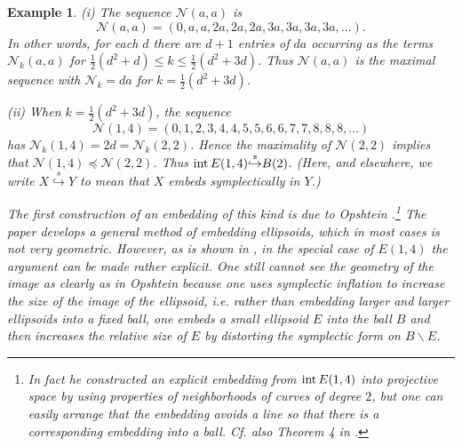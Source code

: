 \documentclass[11pt]{amsart}
\newcommand{\labell}[1] {\label{#1}}
\newcommand{\1}{{{\mathchoice {\rm 1\mskip-4mu l} {\rm 1\mskip-4mu l}
{\rm 1\mskip-4.5mu l} {\rm 1\mskip-5mu l}}}}
\newcommand{\intt}{{\rm int\,}}
\newcommand{\less}{{\smallsetminus}}
\newcommand{\Nn}{{\mathcal N}}
\newcommand{\se} {{\stackrel{s}\hookrightarrow}}
\newtheorem{example}[theorem]{Example}
\numberwithin{figure}{section}
\numberwithin{equation}{section}
\newcommand{\MS}{{\medskip}}
\newcommand{\NI}{{\noindent}}
\begin{document}
\begin{example}\labell{ex:1}\rm (i)
The sequence $\Nn(a,a)$ is
$$
\Nn(a,a) = (0,a,a,2a,2a,2a,3a,3a,3a,3a,\dots).
$$
In other words, for each $d$ there are $d+1$ entries of $da$ 
occurring as the terms $\Nn_k(a,a)$ for $\frac 12(d^2 + d) \le k \le \frac 12(d^2 + 3d)$.  Thus $\Nn(a,a)$ is the maximal sequence with $\Nn_k = da$ for $k = \frac 12(d^2 + 3d)$.
\MS

\NI (ii) When $k = \frac 12(d^2+3d)$, the sequence
$$
 \Nn(1,4) = (0,1,2,3,4,4,5,5,6,6,7,7,8,8,8,\dots)
$$
has $\Nn_k(1,4) = 2d = \Nn_k(2,2)$. Hence the maximality of
$\Nn(2,2)$ implies that
 $\Nn(1,4)\preccurlyeq \Nn(2,2)$.  Thus $\intt E(1,4)\se B(2)$. (Here, and elsewhere, we write $X\se Y$ to mean that $X$ embeds symplectically in $Y$.)  
 
 The first construction of  an embedding of this kind is due to Opshtein \cite{Op}.\footnote{
 In fact he constructed an explicit  embedding from $\intt E(1,4)$ into projective space by using properties of neighborhoods of curves of degree $2$, but one can easily arrange that the embedding  avoids a line so that  there is a corresponding embedding into a ball. Cf. also Theorem 4 in \cite{Op2}.}  
 The paper \cite{M} develops a general  method of embedding ellipsoids, which in most cases is not very geometric.  However, 
 as is shown in \cite[\S1]{M}, in the special case of $E(1,4)$ the argument can be made  rather explicit.  One still cannot see the geometry of the  image as clearly as in Opshtein because one uses symplectic inflation to increase the size of the image of the ellipsoid, i.e. rather than embedding larger and larger ellipsoids into a fixed ball, one embeds a small ellipsoid  $E$ into the ball $B$ and then increases the relative size  of $E$ by distorting  the symplectic form on $B\less E$.
\end{example}
\end{document}
